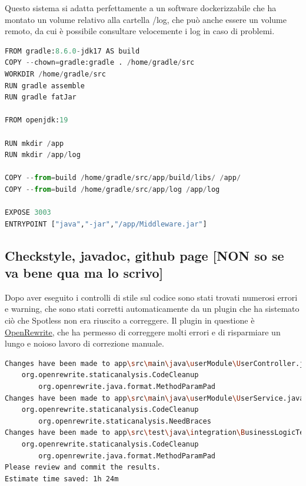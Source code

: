 Questo sistema si adatta perfettamente a un software dockerizzabile che ha montato un volume relativo alla cartella /log, che può anche essere un volume remoto, da cui è possibile consultare velocemente i log in caso di problemi.

\begin{lstlisting}[language=Python, caption={Volume di log nel dockerfile l.13 da montare successivamente}, label=list:dockerfile_log]
FROM gradle:8.6.0-jdk17 AS build
COPY --chown=gradle:gradle . /home/gradle/src
WORKDIR /home/gradle/src
RUN gradle assemble
RUN gradle fatJar 

FROM openjdk:19

RUN mkdir /app
RUN mkdir /app/log

COPY --from=build /home/gradle/src/app/build/libs/ /app/
COPY --from=build /home/gradle/src/app/log /app/log

EXPOSE 3003
ENTRYPOINT ["java","-jar","/app/Middleware.jar"]
\end{lstlisting}


\subsection{Checkstyle, javadoc, github page [NON so se va bene qua ma lo scrivo] }

Dopo aver eseguito i controlli di stile sul codice sono stati trovati numerosi errori e warning, che sono stati corretti automaticamente da un plugin che ha sistemato ciò che Spotless non era riuscito a correggere. Il plugin in questione è \href{https://github.com/openrewrite/rewrite}{\underline{OpenRewrite}}, che ha permesso di correggere molti errori e di risparmiare un lungo e noioso lavoro di correzione manuale.

\begin{lstlisting}[language=Bash, caption={Output di OpenRewrite}, label=list:openrewrite]
Changes have been made to app\src\main\java\userModule\UserController.java by:
    org.openrewrite.staticanalysis.CodeCleanup
        org.openrewrite.java.format.MethodParamPad
Changes have been made to app\src\main\java\userModule\UserService.java by:
    org.openrewrite.staticanalysis.CodeCleanup
        org.openrewrite.staticanalysis.NeedBraces
Changes have been made to app\src\test\java\integration\BusinessLogicTestIntegration.java by:
    org.openrewrite.staticanalysis.CodeCleanup
        org.openrewrite.java.format.MethodParamPad
Please review and commit the results.
Estimate time saved: 1h 24m 
\end{lstlisting}

